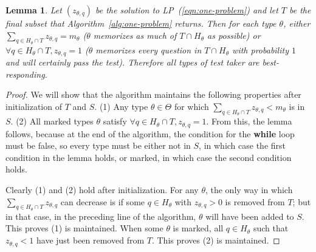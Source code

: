 \documentclass{article}
\newtheorem{lemma}{Lemma}
\begin{document}
\begin{lemma}\label{lemma:best-response}
Let $(z_{\theta,q})$ be the solution to LP~(\ref{eqn:one-problem}) and let $T$ be the
final subset that Algorithm~\ref{alg:one-problem} returns. Then for each type
$\theta$, either $\sum_{q \in H_\theta \cap T} z_{\theta,q} = m_\theta$
($\theta$ memorizes as much of  $T\cap H_\theta$ as possible) or $\forall q \in
H_\theta \cap T, z_{\theta, q} = 1$ ($\theta$ memorizes every question in $T\cap
H_\theta$ with probability $1$ and will certainly pass the test). Therefore
all types of test taker are best-responding.
\end{lemma}

\begin{proof}
  We will show that the algorithm maintains the following properties after
  initialization of $T$ and $S$.  (1) Any type $\theta \in \Theta$ for
  which $\sum_{q \in H_\theta \cap T} z_{\theta,q} < m_\theta$ is in $S$.
  (2) All marked types $\theta$ satisfy $\forall q \in H_\theta \cap T,
  z_{\theta, q} = 1$.  From this, the lemma follows, because at the end of
  the algorithm, the condition for the {\bf while} loop must be false, so
  every type must be either not in $S$, in which case the first condition
  in the lemma holds, or marked, in which case the second condition holds.

  Clearly (1) and (2) hold after initialization.  For any $\theta$, the
  only way in which $\sum_{q \in H_\theta \cap T} z_{\theta,q}$ can
  decrease is if some $q \in H_\theta$ with $z_{\theta,q} > 0$ is removed
  from $T$; but in that case, in the preceding line of the algorithm,
  $\theta$ will have been added to $S$.  This proves (1) is maintained.
  When some $\theta$ is marked, all $q \in H_\theta$ such that
  $z_{\theta,q} < 1$ have just been removed from $T$. This proves (2)
 is maintained.
\end{proof}
\end{document}

